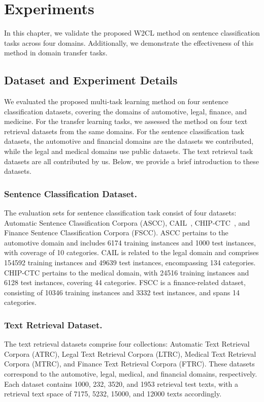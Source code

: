 \section{Experiments}
\label{sec:exp}
In this chapter, we validate the proposed W2CL method on sentence classification tasks across four domains. Additionally, we demonstrate the effectiveness of this method in domain transfer tasks.
\subsection{Dataset and Experiment Details}
We evaluated the proposed multi-task learning method on four sentence classification datasets, covering the domains of automotive, legal, finance, and medicine. For the transfer learning tasks, we assessed the method on four text retrieval datasets from the same domains. For the sentence classification task datasets, the automotive and financial domains are the datasets we contributed, while the legal and medical domains use public datasets. The text retrieval task datasets are all contributed by us. Below, we provide a brief introduction to these datasets.

\subsubsection{Sentence Classification Dataset.} The evaluation sets for sentence classification task consist of four datasets: Automatic Sentence Classification Corpora (ASCC), CAIL~\cite{cail}, CHIP-CTC~\cite{chip}, and Finance Sentence Classification Corpora (FSCC). ASCC pertains to the automotive domain and includes 6174 training instances and 1000 test instances, with coverage of 10 categories. CAIL is related to the legal domain and comprises 154592 training instances and 49639 test instances, encompassing 134 categories. CHIP-CTC pertains to the medical domain, with 24516 training instances and 6128 test instances, covering 44 categories. FSCC is a finance-related dataset, consisting of 10346 training instances and 3332 test instances, and spans 14 categories.

\subsubsection{Text Retrieval Dataset.} The text retrieval datasets comprise four collections: Automatic Text Retrieval Corpora (ATRC), Legal Text Retrieval Corpora (LTRC), Medical Text Retrieval Corpora (MTRC), and Finance Text Retrieval Corpora (FTRC). These datasets correspond to the automotive, legal, medical, and financial domains, respectively. Each dataset contains 1000, 232, 3520, and 1953 retrieval test texts, with a retrieval text space of 7175, 5232, 15000, and 12000 texts accordingly.

